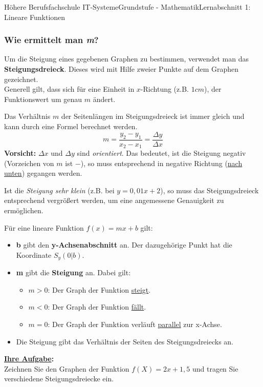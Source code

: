 \documentclass[11pt,twocolumn,oneside,openany,headings=optiontotoc,11pt,numbers=noenddot]{article}
\begin{document}
\begin{worksheet}{Höhere Berufsfachschule IT-Systeme}{Grundstufe - 
		Mathematik}{Lernabschnitt 1: Lineare Funktionen}
		\subsubsection*{Wie ermittelt man \textit{m}?}
		Um die Steigung eines gegebenen Graphen zu bestimmen, verwendet man das \textbf{Steigungsdreieck}. Dieses wird mit Hilfe zweier Punkte auf dem Graphen gezeichnet.\\
		Generell gilt, dass sich für eine Einheit in \(x\)-Richtung (z.B. \(1cm\)), der Funktionswert um genau \(m\) ändert.\\
		\par\noindent
		Das Verhältnis \(m\) der Seitenlängen im Steigungsdreieck ist immer gleich und kann durch eine Formel berechnet werden.
		\[m = \frac{y_2-y_1}{x_2-x_1} = \frac{\Delta{}y}{\Delta{}x}\]
		\textbf{Vorsicht:} \(\Delta{}x\) und \(\Delta{}y\) sind \textit{orientiert}. Das bedeutet, ist die Steigung negativ (Vorzeichen von \(m\) ist \(-\)), so muss entsprechend in negative Richtung (\underline{nach unten}) gegangen werden.\\
		\par\noindent
		Ist die \textit{Steigung sehr klein} (z.B. bei \(y = 0,01x + 2\)), so muss das Steigungsdreieck entsprechend vergrößert werden, um eine angemessene Genauigkeit zu ermöglichen.
		\begin{framed}
			\noindent
			Für eine lineare Funktion \(f(x) = mx+b\) gilt:
			\begin{itemize}
				\item \textbf{b} gibt den \textbf{y-Achsenabschnitt} an. Der dazugehörige Punkt hat die Koordinate \(S_y(0|b)\).
				\item \textbf{m} gibt die \textbf{Steigung} an. Dabei gilt:
				\begin{itemize}
					\item \(m>0\): Der Graph der Funktion \underline{steigt}.
					\item \(m<0\): Der Graph der Funktion \underline{fällt}.
					\item \(m=0\): Der Graph der Funktion verläuft \underline{parallel} zur x-Achse.
				\end{itemize}
				\item Die Steigung gibt das Verhältnis der Seiten des Steigungsdreiecks an.
			\end{itemize}
		\end{framed}
		\noindent
		\textbf{\underline{Ihre Aufgabe}:}\\
		Zeichnen Sie den Graphen der Funktion \(f(X) = 2x + 1,5\) und tragen Sie verschiedene Steigungsdreiecke ein.

\end{worksheet}
\end{document}
